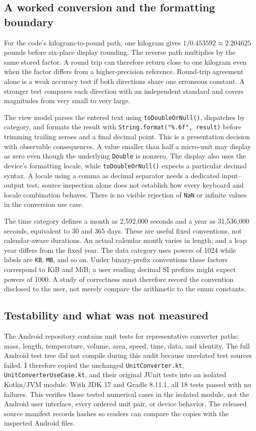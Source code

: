 \documentclass[10pt,letterpaper]{article}
\begin{document}
\subsection{A worked conversion and the formatting boundary}

For the code's kilogram-to-pound path, one kilogram gives $1/0.453592\approx 2.204625$ pounds before six-place display rounding. The reverse path multiplies by the same stored factor. A round trip can therefore return close to one kilogram even when the factor differs from a higher-precision reference. Round-trip agreement alone is a weak accuracy test if both directions share one erroneous constant. A stronger test compares each direction with an independent standard and covers magnitudes from very small to very large.

The view model parses the entered text using \texttt{toDoubleOrNull()}, dispatches by category, and formats the result with \texttt{String.format("\%.6f", result)} before trimming trailing zeroes and a final decimal point. This is a presentation decision with observable consequences. A value smaller than half a micro-unit may display as zero even though the underlying \texttt{Double} is nonzero. The display also uses the device's formatting locale, while \texttt{toDoubleOrNull()} expects a particular decimal syntax. A locale using a comma as decimal separator needs a dedicated input--output test; source inspection alone does not establish how every keyboard and locale combination behaves. There is no visible rejection of \texttt{NaN} or infinite values in the conversion use case.

The time category defines a month as 2,592,000 seconds and a year as 31,536,000 seconds, equivalent to 30 and 365 days. These are useful fixed conventions, not calendar-aware durations. An actual calendar month varies in length, and a leap year differs from the fixed year. The data category uses powers of 1024 while labels are \texttt{KB}, \texttt{MB}, and so on. Under binary-prefix conventions these factors correspond to KiB and MiB; a user reading decimal SI prefixes might expect powers of 1000. A study of correctness must therefore record the convention disclosed to the user, not merely compare the arithmetic to the enum constants.

\subsection{Testability and what was not measured}

The Android repository contains unit tests for representative converter paths: mass, length, temperature, volume, area, speed, time, data, and identity. The full Android test tree did not compile during this audit because unrelated test sources failed. I therefore copied the unchanged \texttt{UnitConverter.kt}, \texttt{UnitConverterUseCase.kt}, and their original JUnit tests into an isolated Kotlin/JVM module. With JDK 17 and Gradle 8.11.1, all 18 tests passed with no failures. This verifies those tested numerical cases in the isolated module, not the Android user interface, every ordered unit pair, or device behavior. The released source manifest records hashes so readers can compare the copies with the inspected Android files.
\end{document}
